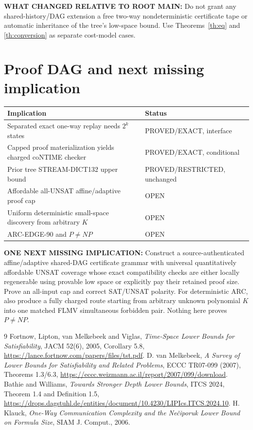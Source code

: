 \documentclass[11pt]{article}
\begin{document}
\noindent\textbf{WHAT CHANGED RELATIVE TO ROOT MAIN:} Do not grant any shared-history/DAG extension a free two-way nondeterministic certificate tape or automatic inheritance of the tree's low-space bound. Use Theorems~\ref{th:eq} and \ref{th:conversion} as separate cost-model cases.

\section{Proof DAG and next missing implication}
\begin{center}\begin{tabular}{p{.60\linewidth}p{.31\linewidth}}\toprule
Implication & Status\\\midrule
Separated exact one-way replay needs $2^k$ states & PROVED/EXACT, interface\\
Capped proof materialization yields charged coNTIME checker & PROVED/EXACT, conditional\\
Prior tree STREAM-DICT132 upper bound & PROVED/RESTRICTED, unchanged\\
Affordable all-UNSAT affine/adaptive proof cap & OPEN\\
Uniform deterministic small-space discovery from arbitrary $K$ & OPEN\\
ARC-EDGE-90 and $P\ne NP$ & OPEN\\\bottomrule\end{tabular}\end{center}
\noindent\textbf{ONE NEXT MISSING IMPLICATION:} Construct a source-authenticated affine/adaptive shared-DAG certificate grammar with universal quantitatively affordable UNSAT coverage whose exact compatibility checks are either locally regenerable using provable low space or explicitly pay their retained proof size. Prove an all-input cap and correct SAT/UNSAT polarity. For deterministic ARC, also produce a fully charged route starting from arbitrary unknown polynomial $K$ into one matched FLMV simultaneous forbidden pair. Nothing here proves $P\ne NP$.

\begin{thebibliography}{9}
 Fortnow, Lipton, van Melkebeek and Viglas, \emph{Time-Space Lower Bounds for Satisfiability}, JACM 52(6), 2005, Corollary 5.8, \url{https://lance.fortnow.com/papers/files/tst.pdf}.
 D. van Melkebeek, \emph{A Survey of Lower Bounds for Satisfiability and Related Problems}, ECCC TR07-099 (2007), Theorems 1.3/6.3, \url{https://eccc.weizmann.ac.il/report/2007/099/download}.
 Bathie and Williams, \emph{Towards Stronger Depth Lower Bounds}, ITCS 2024, Theorem 1.4 and Definition 1.5, \url{https://drops.dagstuhl.de/entities/document/10.4230/LIPIcs.ITCS.2024.10}.
 H. Klauck, \emph{One-Way Communication Complexity and the Ne\v{c}iporuk Lower Bound on Formula Size}, SIAM J. Comput., 2006.
\end{thebibliography}
\end{document}

